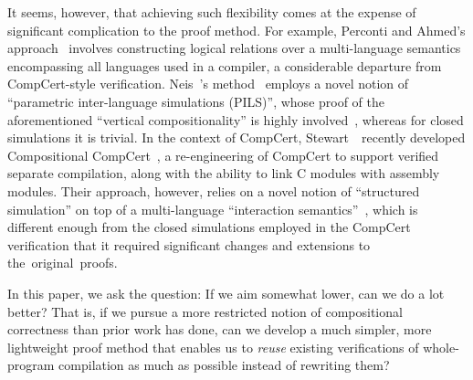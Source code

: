 It seems, however, that achieving such flexibility comes at the
expense of significant complication to the proof method.  For example,
Perconti and Ahmed's approach~\cite{perconti+:esop14} involves constructing logical
relations over a multi-language semantics encompassing all languages
used in a compiler, a considerable departure from CompCert-style
verification.  Neis~\etal's method~\cite{neis+:icfp15} employs a novel notion of
``parametric inter-language simulations (PILS)'', whose proof of the
aforementioned ``vertical compositionality'' is highly
involved~\cite{rts-trans}, whereas for closed simulations it is trivial.
In the context of CompCert, Stewart~\etal\ recently developed
Compositional CompCert~\cite{stewart+:popl2015}, a re-engineering of
CompCert to support verified separate compilation, along with the
ability to link C modules with assembly modules.  Their approach,
however, relies on a novel notion of ``structured simulation'' on top
of a multi-language ``interaction semantics''~\cite{beringer+:esop14},
which is different enough from the closed simulations employed in the
CompCert verification that it required significant changes and
extensions to \mbox{the original proofs}.

In this paper, we ask the question: If we aim somewhat lower, can we
do a lot better?  That is, if we pursue a more restricted notion of
compositional correctness than prior work has done, can we develop a
much simpler, more lightweight proof method that enables us to
\emph{reuse} existing verifications of whole-program compilation as
much as possible instead of rewriting them?


